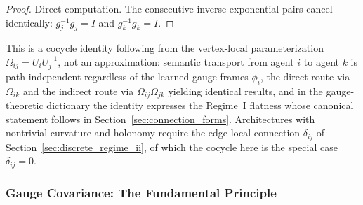 \documentclass[11pt]{article}
\begin{document}
\begin{proof}
Direct computation. The consecutive inverse-exponential pairs cancel identically: $g_j^{-1} g_j = I$ and $g_k^{-1} g_k = I$.
\end{proof}

This is a cocycle identity following from the vertex-local parameterization $\Omega_{ij} = U_iU_j^{-1}$, not an approximation: semantic transport from agent $i$ to agent $k$ is path-independent regardless of the learned gauge frames $\phi_i$, the direct route via $\Omega_{ik}$ and the indirect route via $\Omega_{ij}\Omega_{jk}$ yielding identical results, and in the gauge-theoretic dictionary the identity expresses the Regime~I flatness whose canonical statement follows in Section~\ref{sec:connection_forms}. Architectures with nontrivial curvature and holonomy require the edge-local connection $\delta_{ij}$ of Section~\ref{sec:discrete_regime_ii}, of which the cocycle here is the special case $\delta_{ij} = 0$.

\subsubsection{Gauge Covariance: The Fundamental Principle}
\label{sec:gauge_covariance_principle}
\end{document}
